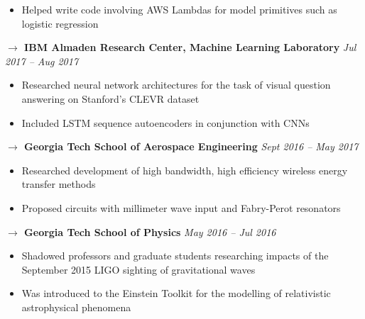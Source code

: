 \documentclass{res}
\begin{document}
\begin{resume}
\begin{itemize}
mization for Cirrus, a serverless machine learning framework
            \item Helped write code involving AWS Lambdas for model primitives such as logistic regression
        \end{itemize}
		\vspace{-10pt}
		{\bf $\rightarrow$ IBM Almaden Research Center, Machine Learning Laboratory} \hfill \emph{Jul 2017 -- Aug 2017} \\
        \vspace{-10pt}
        \begin{itemize}
            \item Researched neural network architectures for the task of visual question answering on Stanford’s CLEVR dataset
            \item Included LSTM sequence autoencoders in conjunction with CNNs
        \end{itemize}
		\vspace{-10pt}
		{\bf $\rightarrow$ Georgia Tech School of Aerospace Engineering} \hfill \emph{Sept 2016 -- May 2017} \\
        \vspace{-10pt}
        \begin{itemize}
            \item Researched development of high bandwidth, high efficiency wireless energy transfer methods
            \item Proposed circuits with millimeter wave input and Fabry-Perot resonators
        \end{itemize}
		\vspace{-10pt}
		{\bf $\rightarrow$ Georgia Tech School of Physics} \hfill \emph{May 2016 -- Jul 2016} \\
        \vspace{-10pt}
        \begin{itemize}
            \item Shadowed professors and graduate students researching impacts of the September 2015 LIGO sighting of gravitational waves
            \item Was introduced to the Einstein Toolkit for the modelling of relativistic astrophysical phenomena
        \end{itemize}
		\vspace{-10pt}

\end{resume}
\end{document}
